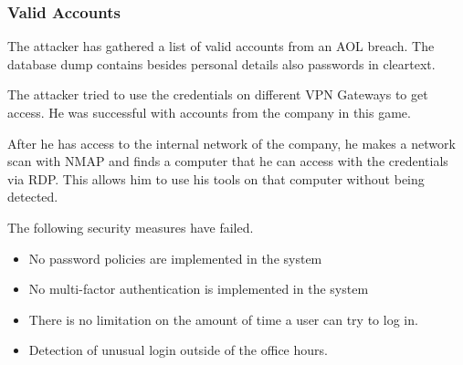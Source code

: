 \subsubsection{Valid Accounts}

The attacker has gathered a list of valid accounts from an AOL breach.
The database dump contains besides personal details also passwords in cleartext.

The attacker tried to use the credentials on different VPN Gateways to get access.
He was successful with accounts from the company in this game.

After he has access to the internal network of the company, he makes a network scan with NMAP and finds a computer that he can access with the credentials via RDP.
This allows him to use his tools on that computer without being detected.

The following security measures have failed.
\begin{itemize}
    \item No password policies are implemented in the system
    \item No multi-factor authentication is implemented in the system
    \item There is no limitation on the amount of time a user can try to log in.
    \item Detection of unusual login outside of the office hours.
\end{itemize}